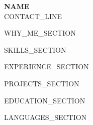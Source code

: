 \documentclass[10pt,a4paper]{article}
\begin{document}
\begin{center}
  {\Huge\bfseries {{NAME}}}\\[6pt]
  \small
  {{CONTACT_LINE}}
\end{center}

\vspace{8pt}

{{WHY_ME_SECTION}}

{{SKILLS_SECTION}}

{{EXPERIENCE_SECTION}}

{{PROJECTS_SECTION}}

{{EDUCATION_SECTION}}

{{LANGUAGES_SECTION}}
\end{document}
